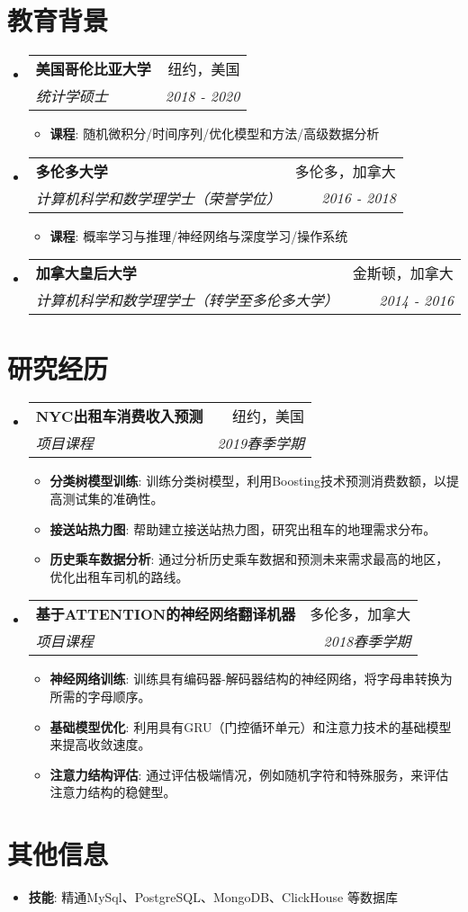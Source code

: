 \documentclass[a4paper,10pt]{article}
\makeatletter
\newcommand{\resumeItem}[2]{
  \item\small{
    \textbf{#1}{: #2 \vspace{-2pt}}
  }
}
\newcommand{\resumeSubheading}[4]{
  \vspace{-1pt}\item
    \begin{tabular*}{0.97\textwidth}[t]{l@{\extracolsep{\fill}}r}
      \textbf{#1} & #2 \\
      \textit{\small#3} & \textit{\small #4} \\
    \end{tabular*}\vspace{-5pt}
}
\newcommand{\resumeSubItem}[2]{\resumeItem{#1}{#2}\vspace{-4pt}}
\newcommand{\resumeSubHeadingListStart}{\begin{itemize}[leftmargin=*]}
\newcommand{\resumeSubHeadingListEnd}{\end{itemize}}
\newcommand{\resumeItemListStart}{\begin{itemize}}
\newcommand{\resumeItemListEnd}{\end{itemize}\vspace{-5pt}}
\makeatother
\begin{document}
\section{教育背景}
\resumeSubHeadingListStart
\resumeSubheading
{美国哥伦比亚大学}{纽约，美国}
{统计学硕士}{2018 - 2020}
\resumeItemListStart
\resumeItem{课程}
{随机微积分/时间序列/优化模型和方法/高级数据分析}
\resumeItemListEnd

\resumeSubheading
{多伦多大学}{多伦多，加拿大}
{计算机科学和数学理学士（荣誉学位）}{2016 - 2018}
\resumeItemListStart
\resumeItem{课程}
{概率学习与推理/神经网络与深度学习/操作系统}
\resumeItemListEnd

\resumeSubheading
{加拿大皇后大学}{金斯顿，加拿大}
{计算机科学和数学理学士（转学至多伦多大学）}{2014 - 2016}
\resumeSubHeadingListEnd

\section{研究经历}
\resumeSubHeadingListStart
\resumeSubheading
{NYC出租车消费收入预测}{纽约，美国}
{项目课程}{2019春季学期}
\resumeItemListStart
\resumeItem{分类树模型训练}
{训练分类树模型，利用Boosting技术预测消费数额，以提高测试集的准确性。}
\resumeItem{接送站热力图}
{帮助建立接送站热力图，研究出租车的地理需求分布。}
\resumeItem{历史乘车数据分析}
{通过分析历史乘车数据和预测未来需求最高的地区，优化出租车司机的路线。}
\resumeItemListEnd

\resumeSubheading
{基于ATTENTION的神经网络翻译机器}{多伦多，加拿大}
{项目课程}{2018春季学期}
\resumeItemListStart
\resumeItem{神经网络训练}
{训练具有编码器-解码器结构的神经网络，将字母串转换为所需的字母顺序。}
\resumeItem{基础模型优化}
{利用具有GRU（门控循环单元）和注意力技术的基础模型来提高收敛速度。}
\resumeItem{注意力结构评估}
{通过评估极端情况，例如随机字符和特殊服务，来评估注意力结构的稳健型。}
\resumeItemListEnd

\resumeSubHeadingListEnd

\section{其他信息}
\resumeSubHeadingListStart
{精通C++、Python、Java、时序数据库、PyTorch、TensorFlow框架；英语流利}
\resumeSubItem{技能}
{精通MySql、PostgreSQL、MongoDB、ClickHouse 等数据库}
\resumeSubHeadingListEnd
\end{document}
